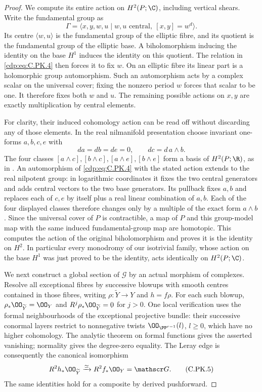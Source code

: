 \begin{proof}
We compute its entire action on $H^2(P;\C)$, including
vertical shears. Write the fundamental group as
\[
 \Gamma=\langle x,y,w,u\mid
       w,u\text{ central},\ [x,y]=w^d\rangle.
\tag{C.PK.4}\label{cdp:eq:C.PK.4}
\]
Its centre $\langle w,u\rangle$ is the fundamental group
of the elliptic fibre, and its quotient is the fundamental
group of the elliptic base. A biholomorphism inducing the
identity on the base $H^1$ induces the identity on this
quotient. The relation in \eqref{cdp:eq:C.PK.4} then forces it to fix
$w$. On an elliptic fibre its linear part is a holomorphic
group automorphism. Such an automorphism acts by a complex
scalar on the universal cover; fixing the nonzero period
$w$ forces that scalar to be one. It therefore fixes both
$w$ and $u$. The remaining possible actions on $x,y$ are
exactly multiplication by central elements.

For clarity, their induced cohomology action can be read
off without discarding any of those elements. In the real
nilmanifold presentation choose invariant one-forms
$a,b,c,e$ with
\[
 da=db=de=0,\qquad dc=d\,a\wedge b.
\]
The four classes $[a\wedge c],[b\wedge c],
[a\wedge e],[b\wedge e]$ form a basis of
$H^2(P;\R)$, as in \cite[\S3]{Borcea1984}.
An automorphism of \eqref{cdp:eq:C.PK.4} with the stated action extends
to the real nilpotent group: in logarithmic coordinates it
fixes the two central generators and adds central vectors
to the two base generators. Its pullback fixes $a,b$ and
replaces each of $c,e$ by itself plus a real linear
combination of $a,b$. Each of the four displayed classes
therefore changes only by a multiple of the exact form
$a\wedge b$. Since the universal cover of $P$ is
contractible, a map of $P$ and this group-model map with
the same induced fundamental-group map are homotopic.
This computes the action of the original biholomorphism
and proves it is the identity on $H^2$.
In particular every monodromy of our isotrivial family,
whose action on the base $H^1$ was just proved to be the
identity, acts identically on $H^2(P;\C)$.

We next construct a global section of $\mathscr G$ by an
actual morphism of complexes. Resolve all exceptional
fibres by successive blowups with smooth centres contained
in those fibres, writing
$\rho:\widetilde Y\to Y$ and $h=f\rho$. For each such
blowup, $\rho_*\OO_{\widetilde Y}=\OO_Y$ and
$R^j\rho_*\OO_{\widetilde Y}=0$ for $j>0$.
One local verification uses the formal neighbourhoods of
the exceptional projective bundle: their successive
conormal layers restrict to nonnegative twists
$\OO_{\PP^{r-1}}(l)$, $l\ge0$, which have no higher
cohomology. The analytic theorem on formal functions
gives the asserted vanishing; normality gives the
degree-zero equality. The Leray edge is consequently the
canonical isomorphism
\[
 R^2h_*\OO_{\widetilde Y}\xrightarrow{\simeq}
 R^2f_*\OO_Y=\mathscr G.
\tag{C.PK.5}\label{cdp:eq:C.PK.5}
\]
The same identities hold for a composite by derived
pushforward.


\end{proof}
